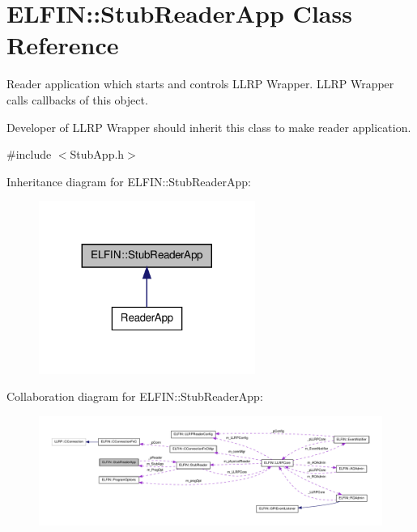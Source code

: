 \hypertarget{class_e_l_f_i_n_1_1_stub_reader_app}{\section{E\-L\-F\-I\-N\-:\-:Stub\-Reader\-App Class Reference}
\label{class_e_l_f_i_n_1_1_stub_reader_app}
}


Reader application which starts and controls L\-L\-R\-P Wrapper. L\-L\-R\-P Wrapper calls callbacks of this object.\par
Developer of L\-L\-R\-P Wrapper should inherit this class to make reader application.  




{\ttfamily \#include $<$Stub\-App.\-h$>$}



Inheritance diagram for E\-L\-F\-I\-N\-:\-:Stub\-Reader\-App\-:
\nopagebreak
\begin{figure}[H]
\begin{center}
\leavevmode
\includegraphics[width=200pt]{class_e_l_f_i_n_1_1_stub_reader_app__inherit__graph}
\end{center}
\end{figure}


Collaboration diagram for E\-L\-F\-I\-N\-:\-:Stub\-Reader\-App\-:
\nopagebreak
\begin{figure}[H]
\begin{center}
\leavevmode
\includegraphics[width=350pt]{class_e_l_f_i_n_1_1_stub_reader_app__coll__graph}
\end{center}
\end{figure}

